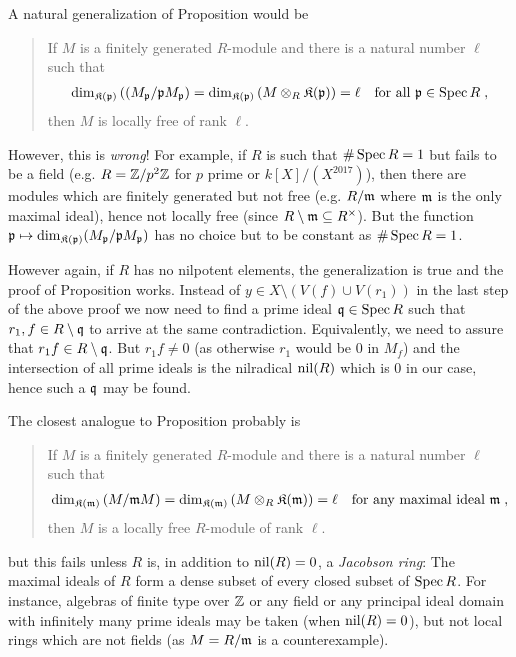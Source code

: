 \documentclass[a4paper,parskip=half,numbers=enddot, DIV=12, headheight=30pt]{scrreprt}
\begin{document}
\begin{rem*}
    \begin{alphanumerate}
      \item 
        A natural generalization of Proposition  would be
        \begin{quote}
            If $M$ is a finitely generated $R$-module and there is a natural number $\ell$ such that
            \begin{align*}
            	\dim_{\mathfrak{K}(\mathfrak{p})}\left((M_{\mathfrak{p}}/\mathfrak{p} M_{\mathfrak{p}}\right) = \dim_{\mathfrak{K}(\mathfrak{p})}\left( M \otimes_R \mathfrak{K}(\mathfrak{p})\right)=\ell\quad\text{for all }\mathfrak{p}\in \operatorname{Spec} R\;,
            \end{align*}
             then $M$ is locally free of rank $\ell$.
        \end{quote}
        However, this is \emph{wrong}! For example, if $R$ is such that $\#\operatorname{Spec} R=1$ but fails to be a field (e.g. $R=\mathbb{Z}/p^2\mathbb{Z}$ for $p$ prime or $k[X]/(X^{2017})$), then there are modules which are finitely generated but not free (e.g. $R/\mathfrak{m}$ where $\mathfrak{m}$ is the only maximal ideal), hence not locally free (since $R\setminus \mathfrak{m}\subseteq R^\times$). But the function $\mathfrak{p}\mapsto \dim_{\mathfrak{K}(\mathfrak{p})}(M_{\mathfrak{p}}/\mathfrak{p} M_{\mathfrak{p}})$ has no choice but to be constant as $\#\operatorname{Spec} R = 1$. 
        
        However again,  if $R$ has no nilpotent elements, the generalization is true and the proof of Proposition  works. Instead of $y\in X\setminus(V(f)\cup V(r_1))$ in the last step of the above proof we now need to find a prime ideal $\mathfrak{q}\in\operatorname{Spec} R$ such that $r_1,f\in R\setminus\mathfrak{q}$ to arrive at the same contradiction. Equivalently, we need to assure that $r_1f\in R\setminus\mathfrak{q}$. But $r_1f\not=0$ (as otherwise $r_1$ would be $0$ in $M_f$) and the intersection of all prime ideals is the nilradical $\operatorname{nil}(R)$ which is $0$ in our case, hence such a $\mathfrak{q}$ may be found.
      \item 
        The closest analogue to Proposition  probably is
        \begin{quote}
            If $M$ is a finitely generated $R$-module and there is a natural number $\ell$ such that 
            \begin{align*}
            	\dim_{\mathfrak{K}(\mathfrak{m})} \left(M/\mathfrak{m} M\right) = \dim_{\mathfrak{K}(\mathfrak{m})} \left(M\otimes_R \mathfrak{K}(\mathfrak{m})\right) = \ell\quad\text{for any maximal ideal }\mathfrak{m}\;, 
            \end{align*}
            then $M$ is a locally free $R$-module of rank $\ell$.
        \end{quote}
        but this fails unless $R$ is, in addition to $\operatorname{nil}(R) = 0$, a \emph{Jacobson ring}: The maximal ideals of $R$ form a dense subset of every closed subset of $\operatorname{Spec} R$. For instance, algebras of finite type over $\mathbb{Z}$ or any field or any principal ideal domain with infinitely many prime ideals may be taken (when $\operatorname{nil}(R) = 0$), but not local rings which are not fields (as $M=R/\mathfrak{m}$ is a counterexample).

    \end{alphanumerate}
\end{rem*}
\end{document}
